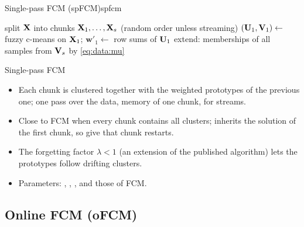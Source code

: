 \begin{algobox}{Single-pass FCM (spFCM)}{spfcm}
\begin{algorithm}[H]
split $\mathbf{X}$ into chunks $\mathbf{X}_1,\dots,\mathbf{X}_s$ (random order unless streaming)\;
$(\mathbf{U}_1,\mathbf{V}_1)\leftarrow$ fuzzy c-means on $\mathbf{X}_1$; $\mathbf{w}'_1\leftarrow$ row sums of $\mathbf{U}_1$\;
extend: memberships of all samples from $\mathbf{V}_s$ by \eqref{eq:data:mu}\;
\end{algorithm}
\end{algobox}
\begin{summarybox}{Single-pass FCM}
\begin{itemize}
  \item Each chunk is clustered together with the weighted prototypes of the previous one; one pass over the data, memory of one chunk,  for streams.
  \item Close to FCM when every chunk contains all clusters; inherits the solution of the first chunk, so give that chunk restarts.
  \item The forgetting factor $\lambda<1$ (an extension of the published algorithm) lets the prototypes follow drifting clusters.
  \item Parameters: , , , and those of FCM.
\end{itemize}
\end{summarybox}

\subsection{Online FCM (oFCM)}\label{sec:data:o}

